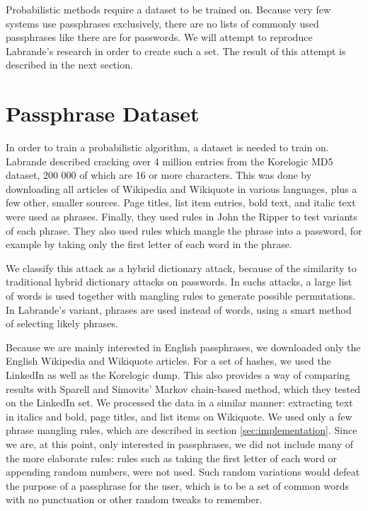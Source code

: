 \documentclass{article}
\begin{document}
Probabilistic methods require a dataset to be trained on. Because very few
systems use passphrases exclusively, there are no lists of commonly used
passphrases like there are for passwords. We will attempt to reproduce
Labrande's research\cite{crackmeimfamous} in order to create such a set. The
result of this attempt is described in the next section.


\section{Passphrase Dataset}\label{sec:dataset}

In order to train a probabilistic algorithm, a dataset is needed to train on.
Labrande described cracking over 4 million entries from the
Korelogic\cite{korelogic} MD5 dataset, 200 000 of which are 16 or more
characters. This was done by downloading all articles of Wikipedia and
Wikiquote in various languages, plus a few other, smaller sources. Page titles,
list item entries, bold text, and italic text were used as phrases. Finally,
they used rules in John the Ripper to test variants of each phrase. They also
used rules which mangle the phrase into a password, for example by taking only
the first letter of each word in the phrase.

We classify this attack as a hybrid dictionary attack, because of the
similarity to traditional hybrid dictionary attacks on passwords. In suchs
attacks, a large list of words is used together with mangling rules to generate
possible permutations. In Labrande's variant, phrases are used instead of
words, using a smart method of selecting likely phrases.

Because we are mainly interested in English passphrases, we downloaded only the
English Wikipedia and Wikiquote articles. For a set of hashes, we used the
LinkedIn as well as the Korelogic dump. This also provides a way of comparing
results with Sparell and Simovits'\cite{sparell-simovits} Markov chain-based
method, which they tested on the LinkedIn set. We processed the data in a
similar manner: extracting text in italics and bold, page titles, and list
items on Wikiquote. We used only a few phrase mangling rules, which are
described in section \ref{sec:implementation}. Since we are, at this point,
only interested in passphrases, we did not include many of the more elaborate
rules: rules such as taking the first letter of each word or appending random
numbers, were not used. Such random variations would defeat the purpose of a
passphrase for the user, which is to be a set of common words with no
punctuation or other random tweaks to remember.
\end{document}
